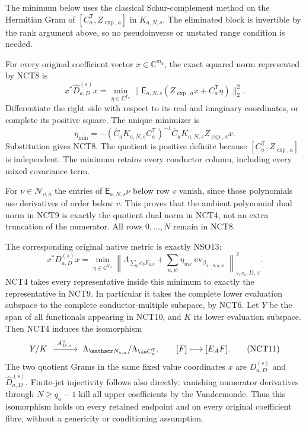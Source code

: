 \documentclass[11pt,a4paper]{article}
\begin{document}
The minimum below uses the classical Schur-complement method
\cite[\S2.1, (2.3)--(2.4)]{human:boyd1994} on the Hermitian Gram of
$[C_a^{\mathsf T},Z_{\exp,a}]$ in $K_{a,N,s}$.
The eliminated block is invertible by the rank argument above, so
no pseudoinverse or unstated range condition is needed.

For every original coefficient vector \(x\in\mathbb C^{m_a}\),
the exact squared norm represented by NCT8 is
\[
 x^*\widehat D_{a,D}^{(s)}x
 =\min_{\eta\in\mathbb C^{q'_a}}
  \|\mathsf E_{a,N,s}(Z_{\exp,a}x+C_a^{\mathsf T}\eta)\|_2^2.
 \tag{NCT9}
\]
Differentiate the right side with respect to its real and imaginary
coordinates, or complete its positive square.  The unique minimizer is
\[
 \eta_{\min}=-(\overline C_aK_{a,N,s}C_a^{\mathsf T})^{-1}
                         \overline C_aK_{a,N,s}Z_{\exp,a}x.
\]
Substitution gives NCT8.  The quotient is positive definite because
\([C_a^{\mathsf T},Z_{\exp,a}]\) is independent.  The minimum
retains every conductor column, including every mixed covariance term.

For \(\nu\in\mathscr N_{v,a}\) the entries of
\(\mathsf E_{a,N,s}\nu\) below row \(v\) vanish, since those
polynomials use derivatives of order below \(v\).  This proves that
the ambient polynomial dual norm in NCT9 is exactly the quotient
dual norm in NCT4, not an extra truncation of the numerator.  All
rows \(0,\ldots,N\) remain in NCT8.

The corresponding original native metric is exactly NSO13:
\[
 x^*D_{a,D}^{(s)}x
   =\min_{\eta\in\mathbb C^{q'_a}}
      \left\|\Lambda_{\sum_bx_bF_{a,b}}
                  +\sum_{u,w}\eta_{uw}\operatorname{ev}_{\beta_{a-8,u,w}}
      \right\|_{s,c_1,D,\vee}^2.
 \tag{NCT10}
\]
NCT4 takes every representative inside this minimum to exactly the
representative in NCT9.  In particular it takes the complete lower
evaluation subspace to the complete conductor-multiple subspace, by
NCT6.  Let \(Y\) be the span of all functionals appearing in NCT10,
and \(K\) its lower evaluation subspace.  Then NCT4 induces the
isomorphism
\[
  Y/K\ \xrightarrow{\ A_{D,s}^{\vee}\ }\
  \Lambda_{\mathscr N_{v,a}}/
                    \Lambda_{\im C_a^{\mathsf T}},
  \qquad [F]\longmapsto[E_AF].
 \tag{NCT11}
\]
The two quotient Grams in the same fixed value coordinates \(x\)
are \(D_{a,D}^{(s)}\) and \(\widehat D_{a,D}^{(s)}\).
Finite-jet injectivity follows also directly: vanishing numerator
derivatives through \(N\ge q_a-1\) kill all upper coefficients by
the Vandermonde.  Thus this isomorphism holds on every retained
endpoint and on every original coefficient fibre, without a
genericity or conditioning assumption.
\end{document}
